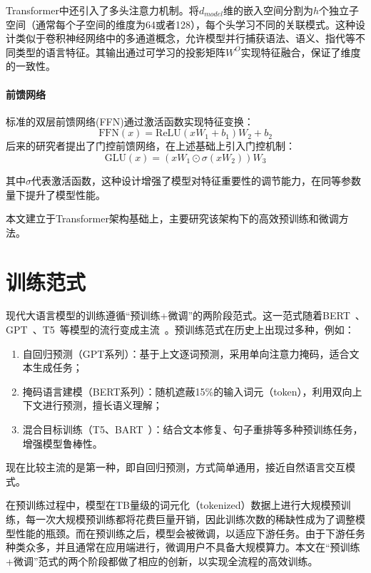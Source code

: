 Transformer中还引入了多头注意力机制。将$d_{model}$维的嵌入空间分割为$h$个独立子空间（通常每个子空间的维度为64或者128），每个头学习不同的关联模式。这种设计类似于卷积神经网络中的多通道概念，允许模型并行捕获语法、语义、指代等不同类型的语言特征。其输出通过可学习的投影矩阵$W^O$实现特征融合，保证了维度的一致性。

\paragraph{前馈网络}
标准的双层前馈网络(FFN)通过激活函数实现特征变换：
\begin{equation}
    \text{FFN}(x) = \text{ReLU}(xW_1 + b_1)W_2 + b_2
\end{equation}
后来的研究者提出了门控前馈网络，在上述基础上引入门控机制：
\begin{equation}
    \text{GLU}(x) = (xW_1 \odot \sigma(xW_2))W_3
\end{equation}

其中$\sigma$代表激活函数，这种设计增强了模型对特征重要性的调节能力，在同等参数量下提升了模型性能。

本文建立于Transformer架构基础上，主要研究该架构下的高效预训练和微调方法。

\section{训练范式}
现代大语言模型的训练遵循“预训练+微调”的两阶段范式。这一范式随着BERT~\cite{devlin2018bert}、GPT~\cite{radford2018improving}、T5~\cite{raffel2020exploring}等模型的流行变成主流~\cite{xu2021pre}。预训练范式在历史上出现过多种，例如：
\begin{enumerate}
    \item 自回归预测（GPT系列）：基于上文逐词预测，采用单向注意力掩码，适合文本生成任务；
    \item 掩码语言建模（BERT系列）：随机遮蔽15\%的输入词元（token），利用双向上下文进行预测，擅长语义理解；
    \item 混合目标训练（T5、BART~\cite{lewis2019bart}）：结合文本修复、句子重排等多种预训练任务，增强模型鲁棒性。
\end{enumerate}
现在比较主流的是第一种，即自回归预测，方式简单通用，接近自然语言交互模式。

在预训练过程中，模型在TB量级的词元化（tokenized）数据上进行大规模预训练，每一次大规模预训练都将花费巨量开销，因此训练次数的稀缺性成为了调整模型性能的瓶颈。而在预训练之后，模型会被微调，以适应下游任务。由于下游任务种类众多，并且通常在应用端进行，微调用户不具备大规模算力。本文在“预训练+微调”范式的两个阶段都做了相应的创新，以实现全流程的高效训练。


